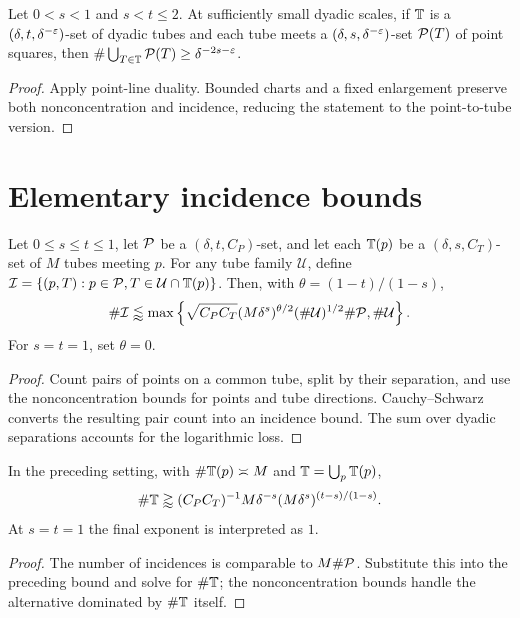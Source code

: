 \begin{theorem}
\label{thm:os-dual}
Let $0<s<1$ and $s<t\leq2$. At sufficiently small dyadic scales,
if $\mathbb{T}$ is a $(\delta,t,\delta^{-\varepsilon})$-set of dyadic tubes and
each tube meets a $(\delta,s,\delta^{-\varepsilon})$-set $\mathcal{P}(T)$ of
point squares, then
$\#\bigcup_{T\in\mathbb{T}}\mathcal{P}(T)\geq\delta^{-2s-\varepsilon}$.
\end{theorem}
\begin{proof}
Apply point-line duality. Bounded charts and a fixed enlargement
preserve both nonconcentration and incidence, reducing the statement
to the point-to-tube version.
\end{proof}

\section{Elementary incidence bounds}

\begin{proposition}
\label{prop:os-incidence}
Let $0\leq s\leq t\leq1$, let $\mathcal{P}$ be a
$(\delta,t,C_P)$-set, and let each $\mathbb{T}(p)$ be a
$(\delta,s,C_T)$-set of $M$ tubes meeting $p$. For any tube family
$\mathcal U$, define
$\mathcal I=\{(p,T):p\in\mathcal{P}, T\in\mathcal U\cap\mathbb{T}(p)\}$.
Then, with $\theta=(1-t)/(1-s)$,
\[
 \#\mathcal I\lessapprox
 \max\left\{\sqrt{C_PC_T}(M\delta^s)^{\theta/2}
                   (\#\mathcal U)^{1/2}\#\mathcal{P}, \#\mathcal U\right\}.
\]
For $s=t=1$, set $\theta=0$.
\end{proposition}
\begin{proof}
Count pairs of points on a common tube, split by their separation,
and use the nonconcentration bounds for points and tube directions.
Cauchy--Schwarz converts the resulting pair count into an incidence
bound. The sum over dyadic separations accounts for the logarithmic
loss.
\end{proof}

\begin{corollary}
\label{cor:os-elementary}
In the preceding setting, with $\#\mathbb{T}(p)\asymp M$ and
$\mathbb{T}=\bigcup_p\mathbb{T}(p)$,
\[
 \#\mathbb{T}\gtrapprox (C_PC_T)^{-1}M\delta^{-s}
                      (M\delta^s)^{(t-s)/(1-s)}.
\]
At $s=t=1$ the final exponent is interpreted as $1$.
\end{corollary}
\begin{proof}
The number of incidences is comparable to $M\#\mathcal{P}$. Substitute
this into the preceding bound and solve for $\#\mathbb{T}$; the
nonconcentration bounds handle the alternative dominated by
$\#\mathbb{T}$ itself.
\end{proof}

